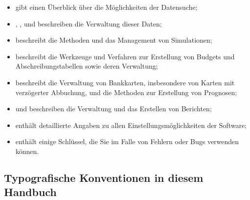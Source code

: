 {\begin{itemize}
	\item {} gibt einen Überblick über die Möglichkeiten der Datensuche;%
	\item {}, ,  und  beschreiben die Verwaltung dieser Daten;%
	\item {} beschreibt die Methoden und das Management von Simulationen;%
	\item {} beschreibt die Werkzeuge und Verfahren zur Erstellung von Budgets und Abschreibungstabellen sowie deren Verwaltung;%
	\item {} beschreibt die Verwaltung von Bankkarten, insbesondere von Karten mit verzögerter Abbuchung, und die Methoden zur Erstellung von Prognosen;%
	\item {} und  beschreiben die Verwaltung und das Erstellen von Berichten;%
	\item {} enthält detaillierte Angaben zu allen Einstellungsmöglichkeiten der Software;%
	\item {} enthält einige Schlüssel, die Sie im Falle von Fehlern oder Bugs verwenden können.%
\end{itemize}


\subsection{Typografische Konventionen in diesem Handbuch\label{introduction-manual-conventions}}

}
